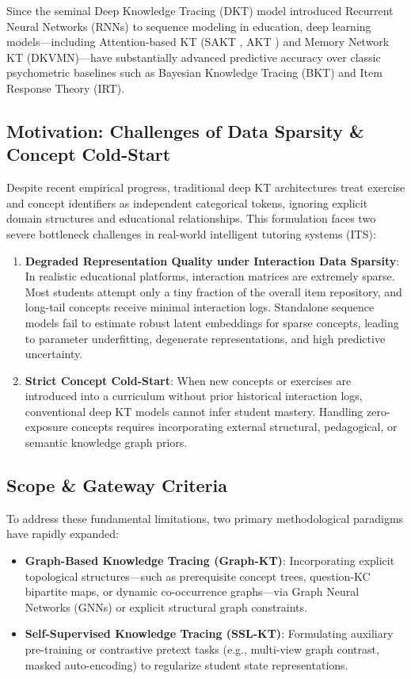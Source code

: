 \documentclass[10pt,journal,compsoc]{IEEEtran}
\begin{document}
Since the seminal Deep Knowledge Tracing (DKT) model \cite{Piech_DKT_2015} introduced Recurrent Neural Networks (RNNs) to sequence modeling in education, deep learning models---including Attention-based KT (SAKT \cite{Pandey_SAKT_2019}, AKT \cite{Ghosh_AKT_2020}) and Memory Network KT (DKVMN)---have substantially advanced predictive accuracy over classic psychometric baselines such as Bayesian Knowledge Tracing (BKT) and Item Response Theory (IRT).

\subsection{Motivation: Challenges of Data Sparsity \& Concept Cold-Start}
Despite recent empirical progress, traditional deep KT architectures treat exercise and concept identifiers as independent categorical tokens, ignoring explicit domain structures and educational relationships. This formulation faces two severe bottleneck challenges in real-world intelligent tutoring systems (ITS):
\begin{enumerate}
    \item \textbf{Degraded Representation Quality under Interaction Data Sparsity}: In realistic educational platforms, interaction matrices are extremely sparse. Most students attempt only a tiny fraction of the overall item repository, and long-tail concepts receive minimal interaction logs. Standalone sequence models fail to estimate robust latent embeddings for sparse concepts, leading to parameter underfitting, degenerate representations, and high predictive uncertainty.
    \item \textbf{Strict Concept Cold-Start}: When new concepts or exercises are introduced into a curriculum without prior historical interaction logs, conventional deep KT models cannot infer student mastery. Handling zero-exposure concepts requires incorporating external structural, pedagogical, or semantic knowledge graph priors.
\end{enumerate}

\subsection{Scope \& Gateway Criteria}
To address these fundamental limitations, two primary methodological paradigms have rapidly expanded:
\begin{itemize}
    \item \textbf{Graph-Based Knowledge Tracing (Graph-KT)}: Incorporating explicit topological structures---such as prerequisite concept trees, question-KC bipartite maps, or dynamic co-occurrence graphs---via Graph Neural Networks (GNNs) or explicit structural graph constraints.
    \item \textbf{Self-Supervised Knowledge Tracing (SSL-KT)}: Formulating auxiliary pre-training or contrastive pretext tasks (e.g., multi-view graph contrast, masked auto-encoding) to regularize student state representations.
\end{itemize}
\end{document}
